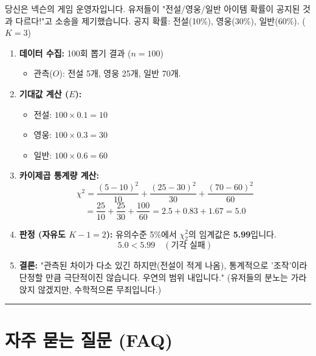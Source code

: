 \documentclass[11pt,a4paper]{book}
\theoremstyle{definition}
\begin{document}
\begin{storybox}[title={Scenario: 유저들의 봉기}]
당신은 넥슨의 게임 운영자입니다. 유저들이 "전설/영웅/일반 아이템 확률이 공지된 것과 다르다!"고 소송을 제기했습니다.
공지 확률: 전설(10\%), 영웅(30\%), 일반(60\%). ($K=3$)
\end{storybox}

\begin{enumerate}
    \item \textbf{데이터 수집:} 100회 뽑기 결과 ($n=100$)
    \begin{itemize}
        \item 관측($O$): 전설 5개, 영웅 25개, 일반 70개.
    \end{itemize}
    \item \textbf{기대값 계산 ($E$):}
    \begin{itemize}
        \item 전설: $100 \times 0.1 = 10$
        \item 영웅: $100 \times 0.3 = 30$
        \item 일반: $100 \times 0.6 = 60$
    \end{itemize}
    \item \textbf{카이제곱 통계량 계산:}
    $$ \chi^2 = \frac{(5-10)^2}{10} + \frac{(25-30)^2}{30} + \frac{(70-60)^2}{60} $$
    $$ = \frac{25}{10} + \frac{25}{30} + \frac{100}{60} = 2.5 + 0.83 + 1.67 = 5.0 $$
    \item \textbf{판정 (자유도 $K-1 = 2$):}
    유의수준 5\%에서 $\chi^2_2$의 임계값은 \textbf{5.99}입니다.
    $$ 5.0 < 5.99 \quad (\text{기각 실패}) $$
    \item \textbf{결론:} "관측된 차이가 다소 있긴 하지만(전설이 적게 나옴), 통계적으로 '조작'이라 단정할 만큼 극단적이진 않습니다. 우연의 범위 내입니다." (유저들의 분노는 가라앉지 않겠지만, 수학적으론 무죄입니다.)
\end{enumerate}

\vspace{0.5cm}\hrule\vspace{0.5cm}

\section{자주 묻는 질문 (FAQ)}
\end{document}
